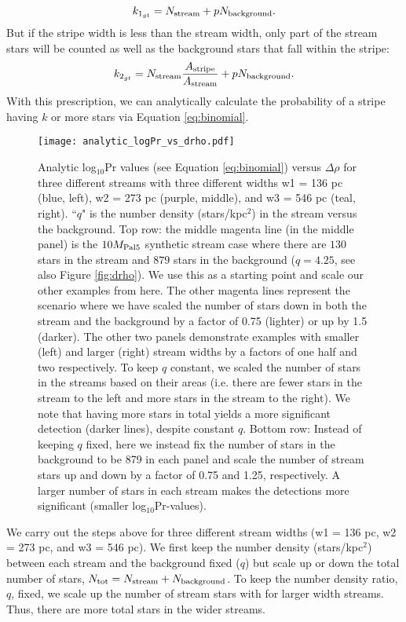 \documentclass[twocolumn]{aastex631}
\begin{document}
\begin{equation}
k_{1_{gt}} = N_{\rm stream} + p N_{\rm background}.
\label{eq:klt_analytic}
\end{equation}
But if the stripe width is less than the stream width, only part of the stream stars will be counted as well as the  background stars that fall within the stripe:
\begin{equation}
k_{2_{gt}} = N_{\rm stream} \frac{A_{\rm stripe}}{A_{\rm stream}} + p N_{\rm background}.
\label{eq:kgt_analytic}
\end{equation}
With this prescription, we can analytically calculate the probability of a stripe having $k$ or more stars via Equation \ref{eq:binomial}. 


\begin{figure*}
\centerline{\texttt{[image: analytic\_logPr\_vs\_drho.pdf]}}
\caption{Analytic log$_{10}$Pr values (see Equation \ref{eq:binomial}) versus $\Delta \rho$ for three different streams with three different widths w1 = 136 pc (blue, left), w2 = 273 pc (purple, middle), and w3 = 546 pc (teal, right). ``$q$" is the number density (stars/kpc$^2$) in the stream versus the background.
Top row: the middle magenta line (in the middle panel) is the $10{M}_{\rm Pal 5}$ synthetic stream case where there are $130$ stars in the stream and $879$ stars in the background ($q = 4.25$, see also Figure \ref{fig:drho}). We use this as a starting point and scale our other examples from here. The other magenta lines represent the scenario where we have scaled the number of stars down in both the stream and the background by a factor of 0.75 (lighter) or up by 1.5 (darker). 
The other two panels demonstrate examples with smaller (left) and larger (right) stream widths by a factors of one half and two respectively. To keep $q$ constant, we scaled the number of stars in the streams based on their areas (i.e. there are fewer stars in the stream to the left and more stars in the stream to the right). We note that having more stars in total yields a more significant detection (darker lines), despite constant $q$.
Bottom row: 
Instead of keeping $q$ fixed, here we instead fix the number of stars in the background to be 879 in each panel and  scale the number of stream stars up and down by a factor of 0.75 and 1.25, respectively. A larger number of stars in each stream makes the detections  more significant (smaller log$_{10}$Pr-values). 
}
\label{fig:drho_analytic}
\end{figure*}

We carry out the steps above for three different stream widths (w1 = 136 pc, w2 = 273 pc, and  w3 = 546 pc). We first keep the number density (stars/kpc$^2$) between each stream and the background fixed ($q$) but scale up or down the total number of stars, $N_{\rm tot} = N_{\rm stream} + N_{\rm background}$. To keep the number density ratio, $q$, fixed, we scale up the number of stream stars with for  larger width streams. Thus, there are more total stars in the wider streams.
\end{document}
